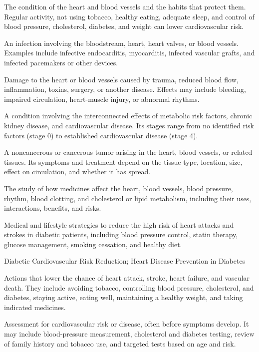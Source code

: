  The condition of the heart and blood vessels and the habits that protect them. Regular activity, not using tobacco, healthy eating, adequate sleep, and control of blood pressure, cholesterol, diabetes, and weight can lower cardiovascular risk.

 An infection involving the bloodstream, heart, heart valves, or blood vessels. Examples include infective endocarditis, myocarditis, infected vascular grafts, and infected pacemakers or other devices.

 Damage to the heart or blood vessels caused by trauma, reduced blood flow, inflammation, toxins, surgery, or another disease. Effects may include bleeding, impaired circulation, heart-muscle injury, or abnormal rhythms.

 A condition involving the interconnected effects of metabolic risk factors, chronic kidney disease, and cardiovascular disease. Its stages range from no identified risk factors (stage 0) to established cardiovascular disease (stage 4).

 A noncancerous or cancerous tumor arising in the heart, blood vessels, or related tissues. Its symptoms and treatment depend on the tissue type, location, size, effect on circulation, and whether it has spread.

 The study of how medicines affect the heart, blood vessels, blood pressure, rhythm, blood clotting, and cholesterol or lipid metabolism, including their uses, interactions, benefits, and risks.

 Medical and lifestyle strategies to reduce the high risk of heart attacks and strokes in diabetic patients, including blood pressure control, statin therapy, glucose management, smoking cessation, and healthy diet.

\synonyms
Diabetic Cardiovascular Risk Reduction; Heart Disease Prevention in Diabetes

 Actions that lower the chance of heart attack, stroke, heart failure, and vascular death. They include avoiding tobacco, controlling blood pressure, cholesterol, and diabetes, staying active, eating well, maintaining a healthy weight, and taking indicated medicines.

 Assessment for cardiovascular risk or disease, often before symptoms develop. It may include blood-pressure measurement, cholesterol and diabetes testing, review of family history and tobacco use, and targeted tests based on age and risk.

